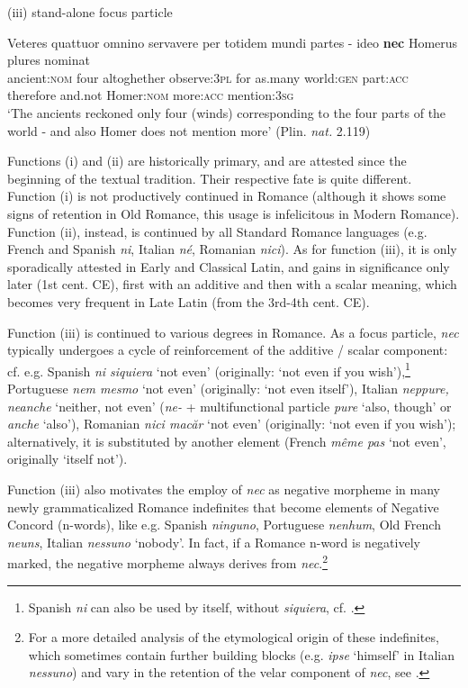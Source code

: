 \documentclass[output=paper,modfonts,nonflat,citecolor=brown,
showindex
]{langsci/langscibook}
\begin{document}
{\begin{exe}
\ex (iii) stand-alone focus particle 

\label{firstfocusnec} \gll Veteres quattuor omnino servavere per totidem mundi partes {- ideo} {\textbf{nec}} Homerus plures nominat\\
ancient:{\textsc{nom}} four altoghether observe:{\textsc{3pl}} for as.many world:{\textsc{gen}} part:{\textsc{acc}} therefore and.not Homer:{\textsc{nom}} more:{\textsc{acc}} mention:{\textsc{3sg}}\\

`The ancients reckoned only four (winds) corresponding to the four parts of the world - and also Homer does not mention more' (Plin. {\emph{nat.}} 2.119)
\end{exe}}

\noindent Functions (i) and (ii) are historically primary, and are attested since the beginning of the textual tradition. Their respective fate is quite different. Function (i) is not productively continued in Romance (although it shows some signs of retention in Old Romance, this usage is infelicitous in Modern Romance). Function (ii), instead, is continued by all Standard Romance languages (e.g. French and Spanish {\emph{ni}}, Italian {\emph{n\'e}}, Romanian {\emph{nici}}). As for function (iii), it is only sporadically attested in Early and Classical Latin, and gains in significance only later (1st cent. CE), first with an additive and then with a scalar meaning, which becomes very frequent in Late Latin (from the 3rd-4th cent. CE). 

Function (iii) is continued to various degrees in Romance. As a focus particle, {\emph{nec}} typically undergoes a cycle of reinforcement of the additive / scalar component: cf. e.g. Spanish {\emph{ni siquiera}} `not even' (originally: `not even if you wish'),{\footnote{Spanish {\emph{ni}} can also be used by itself, without {\emph{siquiera}}, cf. \citet[]{Aranovich06}.}} Portuguese {\emph{nem mesmo}} `not even' (originally: `not even itself'), Italian {\emph{neppure, neanche}} `neither, not even' ({\emph{ne-}} + multifunctional particle {\emph{pure}} `also, though' or {\emph{anche}} `also'), Romanian {\emph{nici mac\u{a}r}} `not even' (originally: `not even if you wish'); alternatively, it is substituted by another element (French {\emph{m\^eme pas}} `not even', originally `itself not'). 

Function (iii) also motivates the employ of {\emph{nec}} as negative morpheme in many newly grammaticalized Romance indefinites that become elements of Negative Concord (n-words), like e.g. Spanish {\emph{ninguno}}, Portuguese {\emph{nenhum}}, Old French {\emph{neuns}}, Italian {\emph{nessuno}} `nobody'. In fact, if a Romance n-word is negatively marked, the negative morpheme always derives from {\emph{nec}}.{\footnote{For a more detailed analysis of the etymological origin of these indefinites, which sometimes contain further building blocks (e.g. {\emph{ipse}} `himself' in Italian {\emph{nessuno}}) and vary in the retention of the velar component of {\emph{nec}}, see \citet[225-228]{Gianollo18}.}} 
\end{document}
